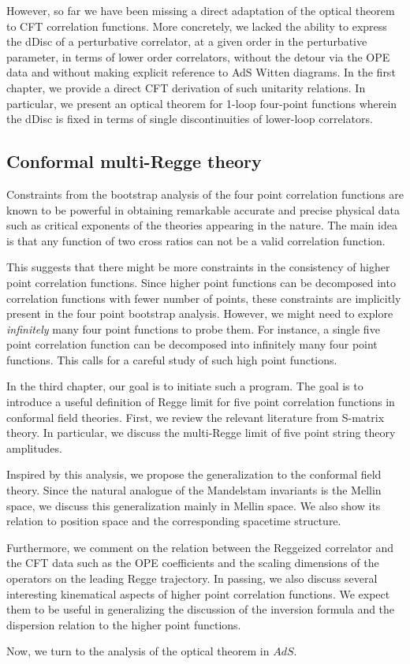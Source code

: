 However, so far we have been missing a direct adaptation of the optical theorem to CFT correlation functions.
More concretely, we lacked the ability to express the dDisc of a perturbative correlator, at a given order in the perturbative parameter, in terms of lower order correlators, without the detour via the OPE data and without making explicit reference to AdS Witten diagrams.
In the first chapter, we provide a direct CFT derivation of such unitarity relations.
In particular, we present an optical theorem for 1-loop four-point functions wherein the dDisc is fixed in terms of single discontinuities of lower-loop  correlators.

\subsection*{Conformal multi-Regge theory}

Constraints from the bootstrap analysis of the four point correlation functions are known to be powerful in obtaining remarkable accurate and precise physical data such as critical exponents of the theories appearing in the nature.
The main idea is that any function of two cross ratios can not  be a valid correlation function.

This suggests that there might be more constraints in the consistency of higher point correlation functions.
Since higher point functions can be decomposed into correlation functions with fewer number of points, these constraints are implicitly present in the four point bootstrap analysis.
However, we might need to explore \emph{infinitely} many four point functions to probe them.
For instance, a single five point correlation function can be decomposed into infinitely many four point functions.
This calls for a careful study of such high point functions.

In the third chapter, our goal is to initiate such a program.
The goal is to introduce a useful definition of Regge limit for five point correlation functions in conformal field theories.
First, we review the relevant literature from S-matrix theory.
In particular, we discuss the multi-Regge limit of five point string theory amplitudes.

Inspired by this analysis, we propose the generalization to the conformal field theory.
Since the natural analogue of the Mandelstam invariants is the Mellin space, we discuss this generalization mainly in Mellin space.
We also show its relation to position space and the corresponding spacetime structure.

Furthermore, we comment on the relation between the Reggeized correlator and the CFT data such as the OPE coefficients and the scaling dimensions of the operators on the leading Regge trajectory.
In passing, we also discuss several interesting kinematical aspects of higher point correlation functions.
We expect them to be useful in generalizing the discussion of the inversion formula and the dispersion relation to the higher point functions.

Now, we turn to the analysis of the optical theorem in $ AdS $.
\cleardoublepage
